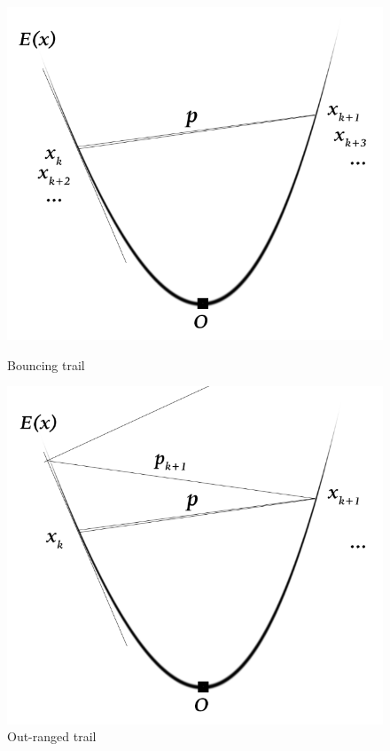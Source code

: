 \documentclass{article}
\begin{document}
\begin{figure}[h]
\begin{minipage}[t]{0.5\linewidth}
\centering
\includegraphics[scale=0.34]{32}
\caption{Bouncing trail}
\end{minipage}%
\begin{minipage}[t]{0.5\linewidth}
\centering
\includegraphics[scale=0.34]{33}
\caption{Out-ranged trail}
\end{minipage}
\end{figure}
\end{document}
